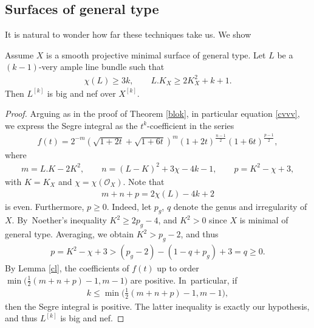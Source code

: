 \subsection{Surfaces of general type} It is natural to wonder how far these techniques take us. We show

\begin{Theorem} \label{gtyp}Assume $X$ is a smooth projective minimal surface of general type. Let $L$ be a~$(k-1)$-very ample line bundle such that
\begin{gather*}
\chi(L)\geq 3k, \qquad L.K_X\geq 2K_X^2+k+1.
\end{gather*}
Then $L^{[k]}$ is big and nef over $X^{[k]}$.
\end{Theorem}

\begin{proof}
Arguing as in the proof of Theorem \ref{blok}, in particular equation \eqref{cvvv}, we express the Segre integral as the $t^k$-coefficient in the series
\begin{gather*}
f(t)=2^{-m} \left(\sqrt{1+2t}+\sqrt{1+6t}\right)^m {(1+2t)}^{\frac{n-1}{2}} (1+6t)^{\frac{p-1}{2}},
\end{gather*}
where
\begin{gather*}
m=L.K-2K^2, \qquad n=(L-K)^2+3\chi - 4k - 1, \qquad p=K^2-\chi+3,
\end{gather*}
with $K=K_X$ and $\chi=\chi(\mathcal O_X)$. Note that
\begin{gather*}
m+n+p=2\chi(L)-4k+2
\end{gather*}
is even. Furthermore, $p\geq 0$. Indeed, let $p_g$, $q$ denote the genus and irregularity of $X$. By~Noet\-her's inequality $K^2\geq 2p_g-4$, and $K^2>0$ since $X$ is minimal of general type. Averaging, we obtain $K^2>p_g-2$, and thus
\begin{gather*}
p=K^2-\chi+3>(p_g-2)-(1-q+p_g)+3=q\geq 0.
\end{gather*}
By Lemma \ref{cl}, the coefficients of
$f(t)$ up to order $\min\big(\frac{1}{2} (m+n+p)-1, m-1\big)$ are positive. In~particular, if
\begin{gather*}
k\leq \min\bigg(\frac{1}{2} (m+n+p)-1, m-1\bigg),
\end{gather*}
then the Segre integral is positive. The latter inequality is exactly our hypothesis, and thus $L^{[k]}$ is big and nef.
\end{proof}

